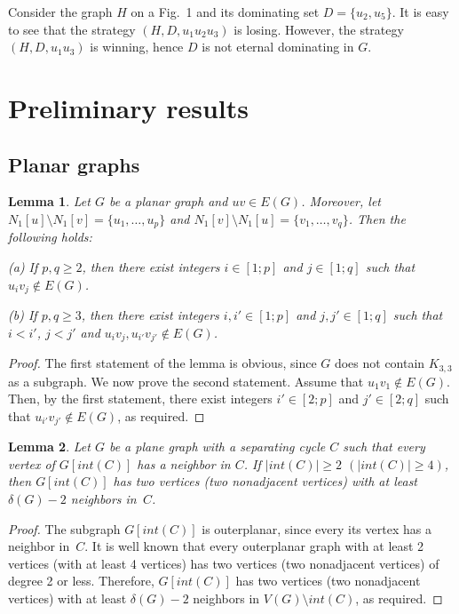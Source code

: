 \documentclass[12pt]{article}
\newtheorem{lemma}{Lemma}
\begin{document}
Consider the graph $H$ on a Fig.~1 and its dominating set $D = \{u_2,u_5\}$. It is easy to see that the strategy $(H,D,u_1u_2u_3)$ is losing. However, the strategy $(H,D,u_1u_3)$ is winning, hence $D$ is not eternal dominating in $G$.


\section{Preliminary results}

\subsection{Planar graphs}

\begin{lemma}\label{l1}
Let $G$ be a planar graph and $uv \in E(G)$. Moreover, let $N_1[u] \setminus N_1[v] = \{u_1,\ldots,u_p\}$ and $N_1[v] \setminus N_1[u] = \{v_1,\ldots,v_q\}$. Then the following holds:

(a) If $p,q \geq 2$, then there exist integers $i \in [1;p]$ and $j \in [1;q]$ such that $u_iv_j \notin E(G)$.

(b) If $p,q \geq 3$, then there exist integers $i,i' \in [1;p]$ and $j,j' \in [1;q]$ such that $i < i'$, $j < j'$ and $u_iv_j,u_{i'}v_{j'} \notin E(G)$.
\end{lemma}

\begin{proof}
The first statement of the lemma is obvious, since $G$ does not contain $K_{3,3}$ as a subgraph. We now prove the second statement. Assume that $u_1v_1 \notin E(G)$. Then, by the first statement, there exist integers $i' \in [2;p]$ and $j' \in [2;q]$ such that $u_{i'}v_{j'} \notin E(G)$, as required.
\end{proof}


\begin{lemma}\label{l2}
Let $G$ be a plane graph with a separating cycle $C$ such that every vertex of $G[int(C)]$ has a neighbor in $C$. If $|int(C)| \geq 2$ $(|int(C)| \geq 4)$, then $G[int(C)]$ has two vertices (two nonadjacent vertices) with at least $\delta(G) - 2$ neighbors in~$C$.
\end{lemma}

\begin{proof} The subgraph $G[int(C)]$ is outerplanar, since every its vertex has a neighbor in~$C$. It is well known that every outerplanar graph with at least 2 vertices (with at least 4 vertices) has two vertices (two nonadjacent vertices) of degree 2 or less. Therefore, $G[int(C)]$ has two vertices (two nonadjacent vertices) with at least $\delta(G) - 2$ neighbors in $V(G) \setminus int(C)$, as required.
\end{proof}
\end{document}
